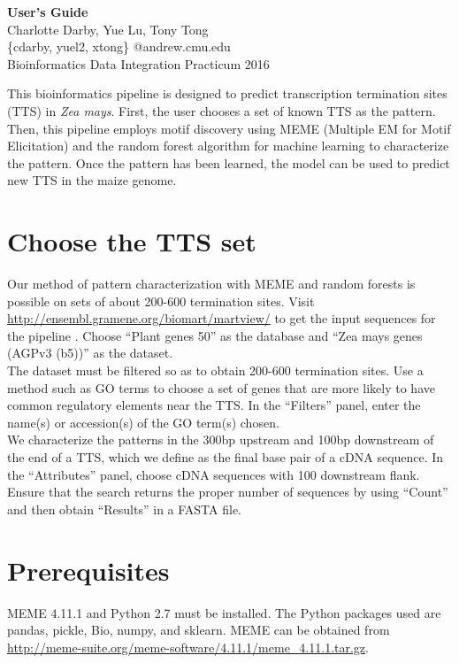 \documentclass[12pt,letterpaper]{report}
\author{Charlotte Darby}
\begin{document}
\begin{center}
{\huge \textbf{User's Guide}}\\
Charlotte Darby, Yue Lu, Tony Tong\\
\{cdarby, yuel2, xtong\} @andrew.cmu.edu\\
Bioinformatics Data Integration Practicum 2016\\
\end{center}

This bioinformatics pipeline is designed to predict transcription termination sites (TTS) in \textsl{Zea mays}. First, the user chooses a set of known TTS as the pattern. Then, this pipeline employs motif discovery using MEME (Multiple EM for Motif Elicitation) \cite{meme} and the random forest algorithm for machine learning \cite{rf} to characterize the pattern. Once the pattern has been learned, the model can be used to predict new TTS in the maize genome.

\section*{Choose the TTS set}

\indent Our method of pattern characterization with MEME and random forests is possible on sets of about 200-600 termination sites. Visit \url{http://ensembl.gramene.org/biomart/martview/} to get the input sequences for the pipeline \cite{biomart}. Choose ``Plant genes 50'' as the database and ``Zea mays genes (AGPv3 (b5))'' as the dataset.\\
\indent The dataset must be filtered so as to obtain 200-600 termination sites. Use a method such as GO terms to choose a set of genes that are more likely to have common regulatory elements near the TTS. In the ``Filters'' panel, enter the name(s) or accession(s) of the GO term(s) chosen.\\
\indent We characterize the patterns in the 300bp upstream and 100bp downstream of the end of a TTS, which we define as the final base pair of a cDNA sequence. In the ``Attributes'' panel, choose cDNA sequences with 100 downstream flank. Ensure that the search returns the proper number of sequences by using ``Count'' and then obtain ``Results'' in a FASTA file. 

\section*{Prerequisites}
\indent MEME 4.11.1 and Python 2.7 must be installed. The Python packages used are pandas, pickle, Bio, numpy, and sklearn. MEME can be obtained from \url{http://meme-suite.org/meme-software/4.11.1/meme_4.11.1.tar.gz}.
\end{document}
